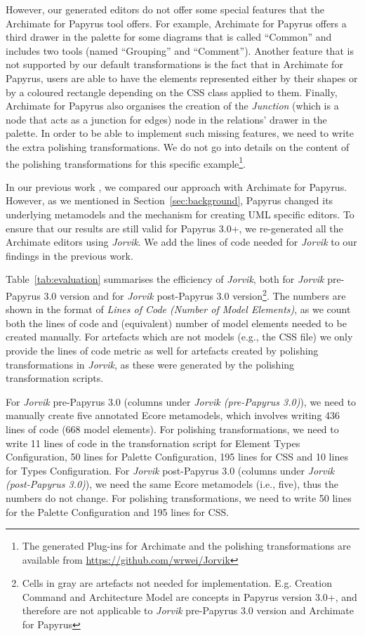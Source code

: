 However, our generated editors do not offer some special features that the Archimate for Papyrus tool offers. 
For example, Archimate for Papyrus offers a third drawer in the palette for some diagrams that is called ``Common'' and includes two tools (named ``Grouping'' and ``Comment''). 
Another feature that is not supported by our default transformations is the fact that in Archimate for Papyrus, users are able to have the elements represented either by their shapes or by a coloured rectangle depending on the CSS class applied to them. 
Finally, Archimate for Papyrus also organises the creation of the \textit{Junction} (which is a node that acts as a junction for edges) node in the relations' drawer in the palette.
In order to be able to implement such missing features, we need to write the extra polishing transformations. 
We do not go into details on the content of the polishing transformations for this specific example\footnote{The generated Plug-ins for Archimate and the polishing transformations are available from \url{https://github.com/wrwei/Jorvik}}.

In our previous work \cite{zolotas2018towards}, we compared our approach with Archimate for Papyrus. 
However, as we mentioned in Section~\ref{sec:background}, Papyrus changed its underlying metamodels and the mechanism for creating UML specific editors. 
To ensure that our results are still valid for Papyrus 3.0+, we re-generated all the Archimate editors using \textit{Jorvik}. 
We add the lines of code needed for \textit{Jorvik} to our findings in the previous work.

Table~\ref{tab:evaluation} summarises the efficiency of \textit{Jorvik}, both for \textit{Jorvik} pre-Papyrus 3.0 version and for \textit{Jorvik} post-Papyrus 3.0 version\footnote{Cells in gray are artefacts not needed for implementation. E.g. Creation Command and Architecture Model are concepts in Papyrus version 3.0+, and therefore are not applicable to \textit{Jorvik} pre-Papyrus 3.0 version and Archimate for Papyrus}. The numbers are shown in the format of \textit{Lines of Code (Number of Model Elements)}, as we count both the lines of code and (equivalent) number of model elements needed to be created manually. For artefacts which are not models (e.g., the CSS file) we only provide the lines of code metric as well for artefacts created by polishing transformations in \textit{Jorvik}, as these were generated by the polishing transformation scripts.

For \textit{Jorvik} pre-Papyrus 3.0 (columns under \textit{Jorvik (pre-Papyrus 3.0)}), we need to manually create five annotated Ecore metamodels, which involves writing 436 lines of code (668 model elements). 
For polishing transformations, we need to write 11 lines of code in the transfornation script for Element Types Configuration, 50 lines for Palette Configuration, 195 lines for CSS and 10 lines for Types Configuration.
For \textit{Jorvik} post-Papyrus 3.0 (columns under \textit{Jorvik (post-Papyrus 3.0)}), we need the same Ecore metamodels (i.e., five), thus the numbers do not change. 
For polishing transformations, we need to write 50 lines for the Palette Configuration and 195 lines for CSS. 

